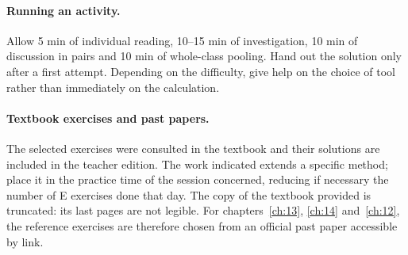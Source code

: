 \paragraph{Running an activity.} Allow 5 min of individual reading, 10--15 min of investigation, 10 min of discussion in pairs and 10 min of whole-class pooling. Hand out the solution only after a first attempt. Depending on the difficulty, give help on the choice of tool rather than immediately on the calculation.
\paragraph{Textbook exercises and past papers.} The selected exercises were consulted in the textbook and their solutions are included in the teacher edition. The work indicated extends a specific method; place it in the practice time of the session concerned, reducing if necessary the number of E exercises done that day. The copy of the textbook provided is truncated: its last pages are not legible. For chapters~\ref{ch:13}, \ref{ch:14} and~\ref{ch:12}, the reference exercises are therefore chosen from an official past paper accessible by link.
